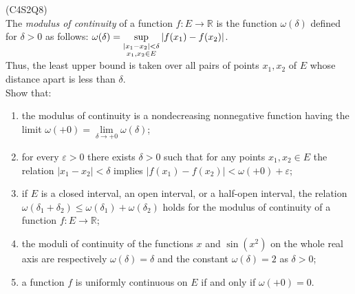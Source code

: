 \begin{prb}
    (C4S2Q8) \\
    The \textit{modulus of continuity} of a function $f : E \to \mathbb{R}$ is the function $\omega(\delta)$ defined for $\delta > 0$ as follows:
    $\omega(\delta) = \sup\limits_{\begin{subarray}{c}|x_1 - x_2| < \delta \\ x_1, x_2 \in E\end{subarray}} |f(x_1) - f(x_2)|$. \\
    Thus, the least upper bound is taken over all pairs of points $x_1, x_2$ of $E$ whose distance apart is less than $\delta$. \\
    Show that: 
    \begin{enumerate}
        \item[a)] the modulus of continuity is a nondecreasing nonnegative function having the limit $\omega(+0) = \lim\limits_{\delta \to +0} \omega(\delta)$;
        \item[b)] for every $\varepsilon > 0$ there exists $\delta > 0$ such that for any points $x_1, x_2 \in E$ the relation $|x_1 - x_2| < \delta$ implies $|f(x_1) - f(x_2)| < \omega(+0) + \varepsilon$;
        \item[c)] if $E$ is a closed interval, an open interval, or a half-open interval, the relation
        $\omega(\delta_1 + \delta_2) \leq \omega(\delta_1) + \omega(\delta_2)$
        holds for the modulus of continuity of a function $f : E \to \mathbb{R}$;
        \item[d)] the moduli of continuity of the functions $x$ and $\sin(x^2)$ on the whole real axis are respectively $\omega(\delta) = \delta$ and the constant $\omega(\delta) = 2$ as $\delta > 0$;
        \item[e)] a function $f$ is uniformly continuous on $E$ if and only if $\omega(+0) = 0$.
    \end{enumerate}
\end{prb}
